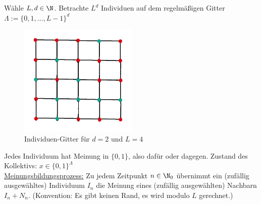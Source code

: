 \begin{beisp}[Wählermodell]\enter
Wähle $L,d\in\N$. Betrachte $L^d$ Individuen auf dem regelmäßigen Gitter\\ $\Lambda:=\lbrace 0,1,\ldots,L-1\rbrace^d$
\begin{figure}[h!]
	\begin{center}
		\includegraphics[width=0.5\textwidth]{./pics/Sketch1.png}
		\caption{Individuen-Gitter für $d=2$ und $L=4$}
		\label{AbbGitter}
	\end{center}
\end{figure}

Jedes Individuum hat Meinung in $\lbrace0,1\rbrace$, also dafür oder dagegen. Zustand des Kollektivs: $x\in\lbrace0,1\rbrace^{\Lambda}$\\

\ul{Meinungsbildungsprozess:} Zu jedem Zeitpunkt $n\in\N_0$ übernimmt ein (zufällig ausgewähltes) Individuum $I_n$ die Meinung eines (zufällig ausgewählten) Nachbarn $I_n+N_n$. (Konvention: Es gibt keinen Rand, es wird modulo $L$ gerechnet.)\\


\end{beisp}
